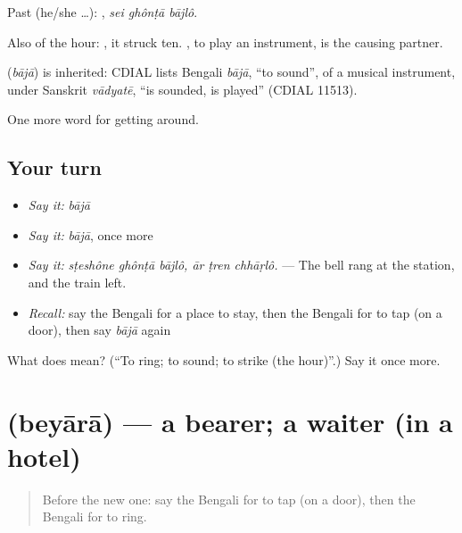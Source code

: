 Past (he/she …):   , \emph{sei ghônṭā bājlô}.

Also of the hour:  , it struck ten. , to play an instrument, is the causing partner.

\begin{cousinweb}
\textbf{} (\emph{bājā}) is inherited: CDIAL lists Bengali \emph{bājā}, \textquotedblleft{}to sound\textquotedblright{}, of a musical instrument, under Sanskrit \emph{vādyatē}, \textquotedblleft{}is sounded, is played\textquotedblright{} (CDIAL 11513).
\end{cousinweb}

\begin{grammarlens}[title={What you've built}]
One more word for getting around.
\end{grammarlens}

\subsection*{Your turn}
\begin{itemize}
\raggedright
  \item \emph{Say it:} \emph{bājā}
  \item \emph{Say it:} \emph{bājā}, once more
  \item \emph{Say it:} \emph{sṭeshône ghônṭā bājlô, ār ṭren chhāṛlô.} — The bell rang at the station, and the train left.
  \item \emph{Recall:} say the Bengali for a place to stay, then the Bengali for to tap (on a door), then say \emph{bājā} again
\end{itemize}

\begin{tcolorbox}[breakable,colback=teal!4,colframe=teal!35!black,title={Before you move on}]
What does  mean? (\textquotedblleft{}To ring; to sound; to strike (the hour)\textquotedblright{}.) Say it once more.
\end{tcolorbox}
\section[\texorpdfstring{\bn{বেয়ারা} (beyārā)}{বেয়ারা (beyārā)}]{ (beyārā) — a bearer; a waiter (in a hotel)}

\label{lesson:BN-C407-beyara}



\begin{quote}
Before the new one: say the Bengali for to tap (on a door), then the Bengali for to ring.
\end{quote}

